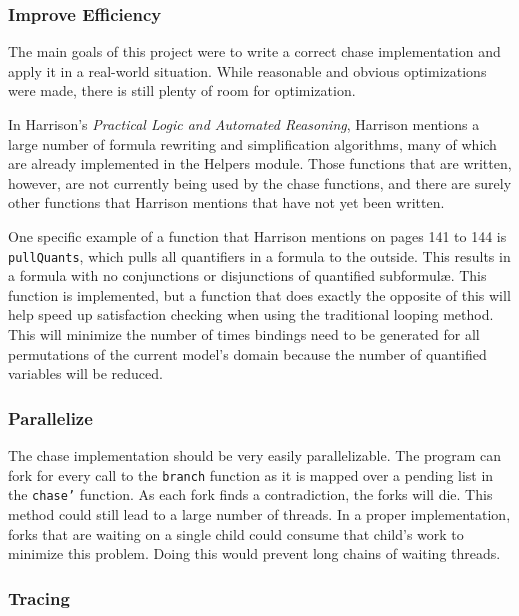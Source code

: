 		\subsubsection{Improve Efficiency}

			The main goals of this project were to write a correct chase
			implementation and apply it in a real-world situation. While
			reasonable and obvious optimizations were made, there is still
			plenty of room for optimization.

			In \cite{Harrison09} Harrison's \emph{Practical Logic and Automated
			Reasoning}, Harrison mentions a large number of formula rewriting
			and simplification algorithms, many of which are already
			implemented in the Helpers module. Those functions that are
			written, however, are not currently being used by the chase
			functions, and there are surely other functions that Harrison
			mentions that have not yet been written.

			One specific example of a function that \cite{Harrison09} Harrison
			mentions on pages 141 to 144 is {\tt pullQuants}, which pulls all
			quantifiers in a formula to the outside. This results in a formula
			with no conjunctions or disjunctions of quantified subformul{\ae}.
			This function is implemented, but a function that does exactly the
			opposite of this will help speed up satisfaction checking when
			using the traditional looping method. This will minimize the number
			of times bindings need to be generated for all permutations of the
			current model's domain because the number of quantified variables
			will be reduced.

		\subsubsection{Parallelize}

			The chase implementation should be very easily parallelizable. The
			program can fork for every call to the {\tt branch} function as it
			is mapped over a pending list in the {\tt chase'} function. As each
			fork finds a contradiction, the forks will die. This method could
			still lead to a large number of threads. In a proper implementation,
			forks that are waiting on a single child could consume that child's
			work to minimize this problem. Doing this would prevent long chains
			of waiting threads.

		\subsubsection{Tracing}

